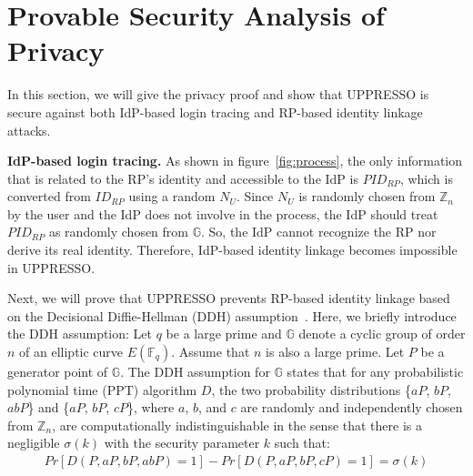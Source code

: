 \section{Provable Security Analysis of Privacy}
\label{sec:privacy}


In this section, we will give the privacy proof and show that UPPRESSO is secure against both IdP-based login tracing and RP-based identity linkage attacks.

\noindent\textbf{IdP-based login tracing.}
As shown in figure~\ref{fig:process}, the only information that is related to the RP's identity and accessible to the IdP is $PID_{RP}$, which is converted from $ID_{RP}$ using a random $N_U$. Since $N_U$ is randomly chosen from $\mathbb{Z}_n$ by the user and the IdP does not involve in the process, the IdP should treat $PID_{RP}$ as randomly chosen from $\mathbb{G}$. So, the IdP cannot recognize the RP nor derive its real identity. Therefore, IdP-based identity linkage becomes impossible in UPPRESSO.

Next, we will prove that UPPRESSO prevents RP-based identity linkage based on the Decisional Diffie-Hellman (DDH) assumption~\cite{GoldwasserK16}. Here, we briefly introduce the DDH assumption:
Let $q$ be a large prime and $\mathbb{G}$ denote a  cyclic group of order $n$ of an elliptic curve $E(\mathbb{F}_q)$.
Assume that $n$ is also a large prime. Let $P$ be a generator point of $\mathbb{G}$. The DDH assumption for $\mathbb{G}$ states that for any probabilistic polynomial time (PPT) algorithm $D$, the two probability distributions \{$aP$, $bP$, $abP$\} and \{$aP$, $bP$, $cP$\}, where $a$, $b$, and $c$ are randomly and independently chosen from $\mathbb{Z}_n$, are computationally indistinguishable in the sense that there is a negligible $\sigma(k)$ with the security parameter $k$ such that:
\vspace{-\topsep}
\begin{multline*}
Pr[D(P, aP, bP, abP)=1]-Pr[D(P, aP, bP, cP)=1]=\sigma(k)
\end{multline*}
\vspace{-\topsep}


